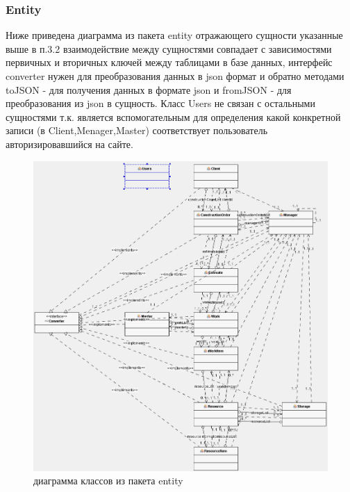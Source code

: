 \subsubsection{Entity}
Ниже приведена диаграмма из пакета entity отражающего сущности указанные выше в п.3.2
взаимодействие между сущностями совпадает с зависимостями первичных и вторичных ключей между таблицами в базе данных, интерфейс converter нужен для преобразования данных в json формат и обратно методами toJSON - для получения данных в формате json и fromJSON - для преобразования из json в сущность. Класс Users не связан с остальными сущностями т.к. является вспомогательным для определения какой конкретной записи (в Client,Menager,Master) соответствует пользователь авторизировавшийся на сайте.
\begin{figure}[!ht]
	\centering
	\includegraphics[width=1\textwidth]{img/entity.png}
	\caption{диаграмма классов из пакета entity}
\end{figure}
